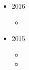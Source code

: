 \begin{itemize}
	
	\item 2016 
	\begin{itemize}
		\item 
	\end{itemize}
	
	\item 2015
	\begin{itemize}
		\item 
		
		\item 
	\end{itemize}
	
\end{itemize}